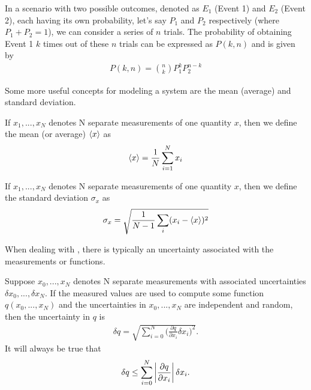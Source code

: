 In a scenario with two possible outcomes, denoted as $E_1$ (Event 1) and $E_2$ (Event 2), each having its own probability, let's say $P_1$ and $P_2$ respectively (where $P_1 + P_2 = 1$), we can consider a series of $n$ trials. The probability of obtaining Event 1 $k$ times out of these $n$ trials can be expressed as $P(k, n)$ and is given by
\begin{align}
P(k,n) = {{n}\choose{k}}P_1^kP_2^{n-k}
\end{align}

Some more useful concepts for modeling a system are the mean (average) and standard deviation. 

\begin{defn}
	If $x_1, ..., x_N$ denotes N separate measurements of one quantity $x$, then we define the mean (or average) $\braket{x}$ as
	\begin{align}
		\braket{x} = \frac{1}{N}\sum_{i=1}^{N}x_i \label{mean equation}
	\end{align}
\end{defn}

\begin{defn}
	If $x_1, ..., x_N$ denotes N separate measurements of one quantity $x$, then we define the standard deviation $\sigma_x$ as
	\begin{align}
		\sigma_x = \sqrt{\frac{1}{N-1}\sum_{i}(x_i-\braket{x})^2}
	\end{align}
\end{defn}

When dealing with , there is typically an uncertainty associated with the measurements or functions.

\begin{defn}
	Suppose $x_0, ..., x_N$ denotes N separate measurements with associated uncertainties $\delta x_0, ..., \delta x_N$. If the measured values are used to compute some function $q(x_0, ..., x_N)$ and the uncertainties in $x_0, ..., x_N$ are independent and random, then the uncertainty in $q$ is
	\begin{align}
		\delta q = \sqrt{\sum_{i=0}^{N}\bigg(\frac{\partial q}{\partial x_i} \delta x_i\bigg)^2}.
	\end{align}
 It will always be true that 
 	\begin{align}
		\delta q \leq \sum_{i=0}^{N}\left| \frac{\partial q}{\partial x_i} \right| \delta x_i.
	\end{align}
\end{defn}
